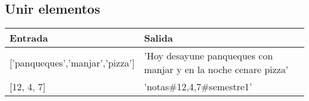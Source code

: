 \subsection{Unir elementos}
\begin{table}[h]
	\centering
	\label{format y join}
	\begin{tabular}{|l|l|}
		\hline
		\textbf{Entrada}                    & \textbf{Salida}                                                 \\ \hline
		{[}'panqueques','manjar','pizza'{]} & 'Hoy desayune panqueques con manjar y en la noche cenare pizza' \\ \hline
		{[}12, 4, 7{]}                      & 'notas\#12,4,7\#semestre1'                                     \\ \hline
	\end{tabular}
\end{table}